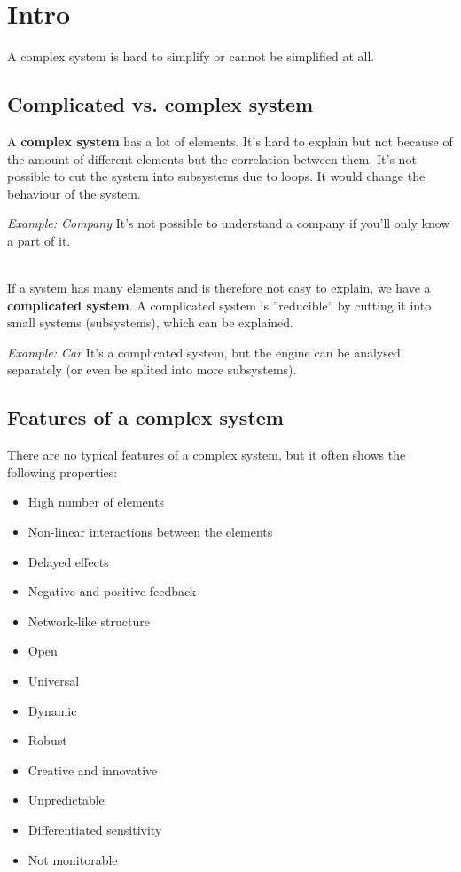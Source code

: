 \hypertarget{intro}{%
\section{Intro}\label{intro}}

A complex system is hard to simplify or cannot be simplified at all.

\hypertarget{complicated-vs.complex-system}{%
\subsection{Complicated vs. complex
system}\label{complicated-vs.complex-system}}

A \textbf{complex system} has a lot of elements. It's hard to explain
but not because of the amount of different elements but the
correlation between them. It's not possible to cut the system into subsystems
due to loops. It would change the behaviour of the system.

\emph{Example: Company} It's not possible to understand a company if you'll only know a part of it.

\mbox{}\\
If a system has many elements and is therefore not easy to explain, we
have a \textbf{complicated system}. A complicated system is
''reducible'' by cutting it into small systems (subsystems), which can
be explained.

\emph{Example: Car} It's a complicated system, but the engine can be analysed separately
(or even be splited into more subsystems).

\hypertarget{features-of-a-complex-system}{%
\subsection{Features of a complex
system}\label{features-of-a-complex-system}}

There are no typical features of a complex system, but it often shows
the following properties:

\begin{itemize}
\tightlist
\item High number of elements
\item Non-linear interactions between the elements
\item Delayed effects
\item Negative and positive feedback
\item Network-like structure
\item Open
\item Universal
\item Dynamic
\item Robust
\item Creative and innovative
\item Unpredictable
\item Differentiated sensitivity
\item Not monitorable
\end{itemize}

